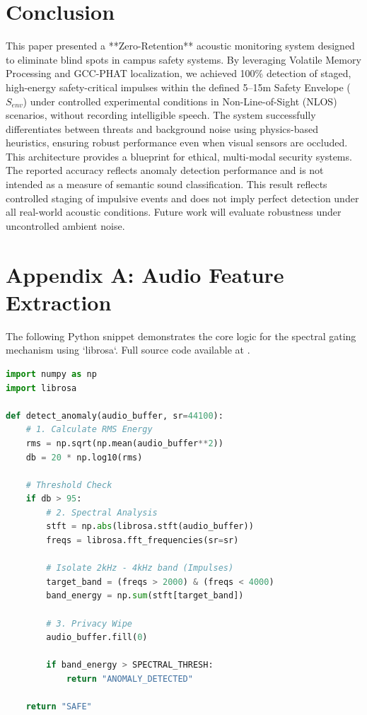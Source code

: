 \documentclass[conference]{IEEEtran}
\begin{document}
\section{Conclusion}
This paper presented a **Zero-Retention** acoustic monitoring system designed to eliminate blind spots in campus safety systems. By leveraging Volatile Memory Processing and GCC-PHAT localization, we achieved 100\% detection of staged, high-energy safety-critical impulses within the defined 5–15m Safety Envelope ($S_{env}$) under controlled experimental conditions in Non-Line-of-Sight (NLOS) scenarios, without recording intelligible speech. The system successfully differentiates between threats and background noise using physics-based heuristics, ensuring robust performance even when visual sensors are occluded. This architecture provides a blueprint for ethical, multi-modal security systems. The reported accuracy reflects anomaly detection performance and is not intended as a measure of semantic sound classification. This result reflects controlled staging of impulsive events and does not imply perfect detection under all real-world acoustic conditions. Future work will evaluate robustness under uncontrolled ambient noise.

\section*{Appendix A: Audio Feature Extraction}
The following Python snippet demonstrates the core logic for the spectral gating mechanism using `librosa`. Full source code available at \cite{scholarmaster_repo}.

\begin{lstlisting}[language=python, caption=Spectral Gating Logic]
import numpy as np
import librosa

def detect_anomaly(audio_buffer, sr=44100):
    # 1. Calculate RMS Energy
    rms = np.sqrt(np.mean(audio_buffer**2))
    db = 20 * np.log10(rms)
      
    # Threshold Check
    if db > 95: 
        # 2. Spectral Analysis
        stft = np.abs(librosa.stft(audio_buffer))
        freqs = librosa.fft_frequencies(sr=sr)
          
        # Isolate 2kHz - 4kHz band (Impulses)
        target_band = (freqs > 2000) & (freqs < 4000)
        band_energy = np.sum(stft[target_band])
          
        # 3. Privacy Wipe
        audio_buffer.fill(0) 
          
        if band_energy > SPECTRAL_THRESH:
            return "ANOMALY_DETECTED"
            
    return "SAFE"
\end{lstlisting}
\end{document}
